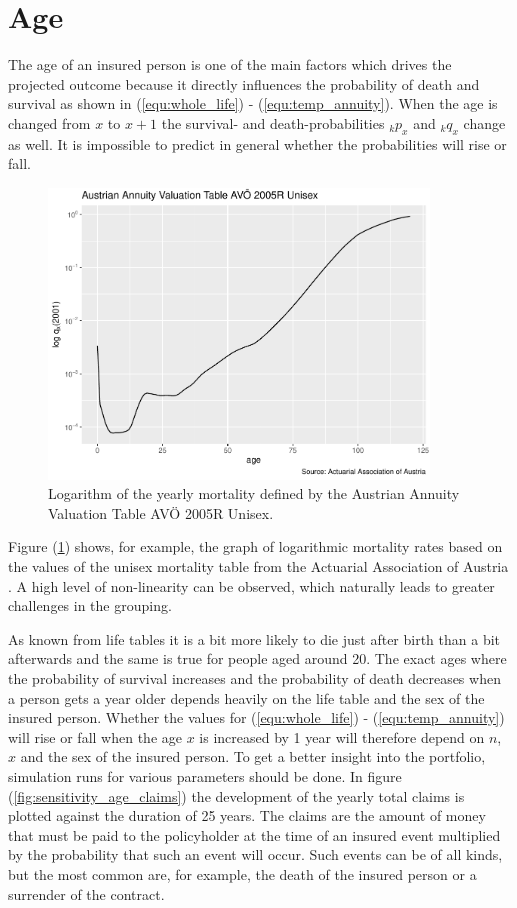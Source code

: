 \section{Age}
\label{sec:age} 
The age of an insured person is one of the main factors which drives the projected outcome because it directly influences the probability of death and survival as shown in (\ref{equ:whole_life}) - (\ref{equ:temp_annuity}). When the age is changed from $x$ to $x+1$ the survival- and death-probabilities ${}_{k}p_x$ and ${}_{k}q_x$ change as well. It is impossible to predict in general whether the probabilities will rise or fall.
\begin{figure}
	\centering
	\includegraphics[width=0.9\textwidth]{figures/chapter_sensitivities/Austrian_Annuity_Valuation_Table/avoe_2005R_unisex}
	\caption{Logarithm of the yearly mortality defined by the Austrian Annuity Valuation Table AVÖ 2005R Unisex.}
	\label{fig:sensitivity_annuity_table_graph}
\end{figure}
Figure (\ref{fig:sensitivity_annuity_table_graph}) shows, for example, the graph of logarithmic mortality rates based on the values of the unisex mortality table from the Actuarial Association of Austria \cite{kainhofer2006new}. A high level of non-linearity can be observed, which naturally leads to greater challenges in the grouping.

As known from life tables it is a bit more likely to die just after birth than a bit afterwards and the same is true for people aged around 20.  The exact ages where the probability of survival increases and the probability of death decreases when a person gets a year older depends heavily on the life table and the sex of the insured person. Whether the values for (\ref{equ:whole_life}) - (\ref{equ:temp_annuity}) will rise or fall when the age $x$ is increased by 1 year will therefore depend on $n$, $x$ and the sex of the insured person. To get a better insight into the portfolio, simulation runs for various parameters should be done. 
In figure (\ref{fig:sensitivity_age_claims}) the development of the yearly total claims is plotted against the duration of 25 years. The claims are the amount of money that must be paid to the policyholder at the time of an insured event multiplied by the probability that such an event will occur. Such events can be of all kinds, but the most common are, for example, the death of the insured person or a surrender of the contract. 

